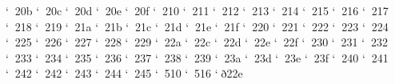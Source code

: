 \XeTeXcharclass `^^^^^1d20b \symbols
\XeTeXcharclass `^^^^^1d20c \symbols
\XeTeXcharclass `^^^^^1d20d \symbols
\XeTeXcharclass `^^^^^1d20e \symbols
\XeTeXcharclass `^^^^^1d20f \symbols
\XeTeXcharclass `^^^^^1d210 \symbols
\XeTeXcharclass `^^^^^1d211 \symbols
\XeTeXcharclass `^^^^^1d212 \symbols
\XeTeXcharclass `^^^^^1d213 \symbols
\XeTeXcharclass `^^^^^1d214 \symbols
\XeTeXcharclass `^^^^^1d215 \symbols
\XeTeXcharclass `^^^^^1d216 \symbols
\XeTeXcharclass `^^^^^1d217 \symbols
\XeTeXcharclass `^^^^^1d218 \symbols
\XeTeXcharclass `^^^^^1d219 \symbols
\XeTeXcharclass `^^^^^1d21a \symbols
\XeTeXcharclass `^^^^^1d21b \symbols
\XeTeXcharclass `^^^^^1d21c \symbols
\XeTeXcharclass `^^^^^1d21d \symbols
\XeTeXcharclass `^^^^^1d21e \symbols
\XeTeXcharclass `^^^^^1d21f \symbols
\XeTeXcharclass `^^^^^1d220 \symbols
\XeTeXcharclass `^^^^^1d221 \symbols
\XeTeXcharclass `^^^^^1d222 \symbols
\XeTeXcharclass `^^^^^1d223 \symbols
\XeTeXcharclass `^^^^^1d224 \symbols
\XeTeXcharclass `^^^^^1d225 \symbols
\XeTeXcharclass `^^^^^1d226 \symbols
\XeTeXcharclass `^^^^^1d227 \symbols
\XeTeXcharclass `^^^^^1d228 \symbols
\XeTeXcharclass `^^^^^1d229 \symbols
\XeTeXcharclass `^^^^^1d22a \symbols
\XeTeXcharclass `^^^^^1d22c \symbols
\XeTeXcharclass `^^^^^1d22d \symbols
\XeTeXcharclass `^^^^^1d22e \symbols
\XeTeXcharclass `^^^^^1d22f \symbols
\XeTeXcharclass `^^^^^1d230 \symbols
\XeTeXcharclass `^^^^^1d231 \symbols
\XeTeXcharclass `^^^^^1d232 \symbols
\XeTeXcharclass `^^^^^1d233 \symbols
\XeTeXcharclass `^^^^^1d234 \symbols
\XeTeXcharclass `^^^^^1d235 \symbols
\XeTeXcharclass `^^^^^1d236 \symbols
\XeTeXcharclass `^^^^^1d237 \symbols
\XeTeXcharclass `^^^^^1d238 \symbols
\XeTeXcharclass `^^^^^1d239 \symbols
\XeTeXcharclass `^^^^^1d23a \symbols
\XeTeXcharclass `^^^^^1d23d \symbols
\XeTeXcharclass `^^^^^1d23e \symbols
\XeTeXcharclass `^^^^^1d23f \symbols
\XeTeXcharclass `^^^^^1d240 \symbols
\XeTeXcharclass `^^^^^1d241 \symbols
\XeTeXcharclass `^^^^^1d242 \symbols
\XeTeXcharclass `^^^^^1d242 \symbols
\XeTeXcharclass `^^^^^1d243 \symbols
\XeTeXcharclass `^^^^^1d244 \symbols
\XeTeXcharclass `^^^^^1d245 \symbols
\XeTeXcharclass `^^^^^1d510 \symbols
\XeTeXcharclass `^^^^^1d516 \symbols
\XeTeXcharclass `^^^^^f022e \symbols



 \symbols {\Symbol }
\XeTeXinterchartoks {} {\rmfamily }

 \symbols {\Symbol }
\XeTeXinterchartoks {} {\rmfamily }



